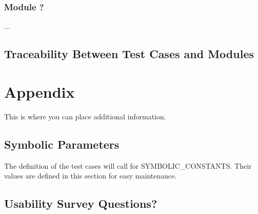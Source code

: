 \documentclass[12pt, titlepage]{article}
\begin{document}
\subsubsection{Module ?}

...

\subsection{Traceability Between Test Cases and Modules}

				




\newpage

\section{Appendix}

This is where you can place additional information.

\subsection{Symbolic Parameters}

The definition of the test cases will call for SYMBOLIC\_CONSTANTS.
Their values are defined in this section for easy maintenance.

\subsection{Usability Survey Questions?}

\end{document}
